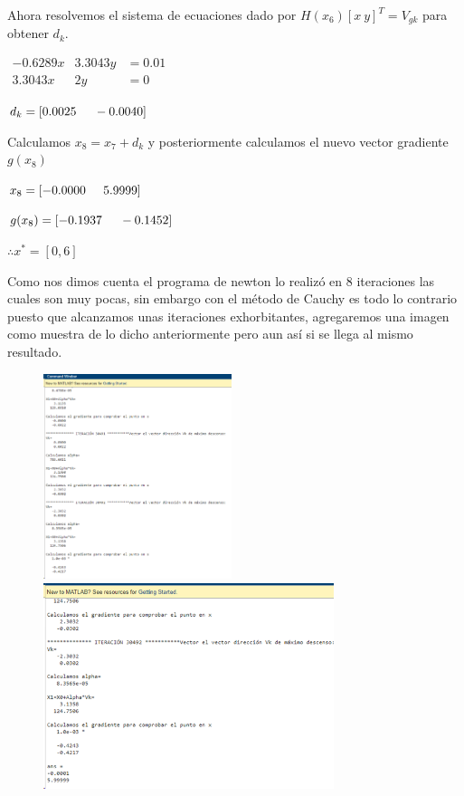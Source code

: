 \documentclass[12pt]{article}
\begin{document}
	Ahora resolvemos el sistema de ecuaciones dado por $H(x_6)[x\ y]^T=V_{gk}$ para obtener $d_k$.
	
	\begin{center}
		$\begin{array}{ccc}
			-0.6289x &3.3043y & =0.01\\
			3.3043x & 2y & =0
		\end{array}$
		
		$d_k=[0.0025\hspace{0.5cm}-0.0040]$
	\end{center}	
	
	Calculamos $x_8=x_7+d_k$ y posteriormente calculamos el nuevo vector gradiente $g(x_8)$
	
	\begin{center}
		$x_8=[-0.0000  \hspace{0.5cm} 5.9999]$
		
		$g(x_8)=[-0.1937 \hspace{0.5cm}-0.1452]$
		
		$\therefore x^*=[0,6]$
	\end{center}


Como nos dimos cuenta el programa de newton lo realizó en 8 iteraciones las cuales son muy pocas, sin embargo con el método de Cauchy es todo lo contrario puesto que alcanzamos unas iteraciones exhorbitantes, agregaremos una imagen como muestra de lo dicho anteriormente pero aun así si se llega al mismo resultado.
\begin{figure}[H]
    \centering
    \includegraphics[height = 6cm]{resultados_MP.png}
    \includegraphics[height = 6cm]{resultados_MP1.png}
\end{figure}
\end{document}
